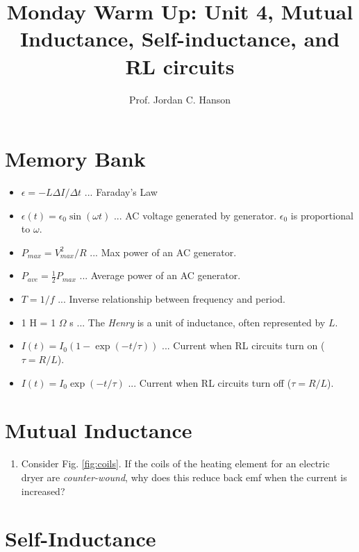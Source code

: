 \documentclass{article}
\begin{document}
\twocolumn

\title{Monday Warm Up: Unit 4, Mutual Inductance, Self-inductance, and RL circuits}
\author{Prof. Jordan C. Hanson}

\maketitle

\section{Memory Bank}

\begin{itemize}
\item $\epsilon = -L \Delta I /\Delta t$ ... Faraday's Law
\item $\epsilon(t) = \epsilon_0 \sin(\omega t)$ ... AC voltage generated by generator.  $\epsilon_0$ is proportional to $\omega$.
\item $P_{max} = V_{max}^2/R$ ... Max power of an AC generator.
\item $P_{ave} = \frac{1}{2} P_{max}$ ... Average power of an AC generator.
\item $T = 1/f$ ... Inverse relationship between frequency and period.
\item 1 H = 1 $\Omega$ s ... The \textit{Henry} is a unit of inductance, often represented by $L$.
\item $I(t) = I_0\left(1 - \exp(-t/\tau)\right)$ ... Current when RL circuits turn on ($\tau = R/L$).
\item $I(t) = I_0\exp(-t/\tau)$ ... Current when RL circuits turn off ($\tau = R/L$).
\end{itemize}

\section{Mutual Inductance}

\begin{enumerate}
\item Consider Fig. \ref{fig:coils}.  If the coils of the heating element for an electric dryer are \textit{counter-wound}, why does this reduce back emf when the current is increased? \\ \vspace{1cm}
\end{enumerate}

\section{Self-Inductance}
\end{document}
